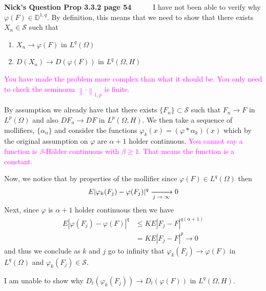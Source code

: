 \documentclass[a4paper,11pt]{article}
\numberwithin{equation}{section}
\theoremstyle{plain}
\theoremstyle{definition}
\newcommand{\Norm}[1]{\left\|  #1   \right\|}
\newcounter{NQ}
\newenvironment{NickQuestion}[1][] %
{\refstepcounter{NQ}
	\begin{mdframed}[backgroundcolor=lightgray]\textbf{Nick's Question \theNQ \: #1~~}~~~\noindent}%
	{\end{mdframed}}
\numberwithin{NQ}{section}
\numberwithin{LQ}{section}
\numberwithin{ZQ}{section}
\begin{document}
\begin{NickQuestion}[Prop 3.3.2 page 54]
	I have not been able to verify why $\varphi(F) \in \mathbb D^{1,q}$. By definition, this means that we need to show that there exists $X_n \in \mathcal S$ such that
	\begin{enumerate}
		\item $X_n \to \varphi(F)$ in $L^q(\Omega)$
		\item $D(X_n) \to D(\varphi(F))$ in $L^q(\Omega,H)$
	\end{enumerate}

	\textcolor{magenta}{You have made the problem more complex than what it should be. You only need to check the seminorm $\Norm{\cdot}_{1,p}$ is finite.}


	By assumption we already have that there exists $\{F_n\} \subset \mathcal S$ such that $F_n \to F$ in $L^p(\Omega)$ and also $DF_n \to DF$ in $L^p(\Omega,H)$. We then take a sequence of
	mollifiers, $\{\alpha_n\}$ and consider the functions $\varphi_k(x) = (\varphi * \alpha_k)(x)$ which by the original assumption on $\varphi$ are $\alpha+1$ holder continuous.
	\textcolor{magenta}{You cannot say a function is $\beta$-H\"older continuous with $\beta\ge 1$. That means the function is a constant.}

	Now, we notice that by properties of the mollifier since $\varphi(F) \in L^q(\Omega)$ then
		\begin{align*}
			E|\varphi_k(F_j)-\varphi(F_j)|^q \xrightarrow[\text{\text{$j \to \infty$}}]{\text{}} 0
		\end{align*}
	Next, since $\varphi$ is $\alpha +1$ holder continuous then we have
		\begin{align*}
				E|\varphi(F_j)-\varphi(F)|^q &\le KE|F_j-F|^{q(\alpha+1)}
				\\&=KE|F_j-F|^{p} \to 0
		\end{align*}
	and thus we conclude as $k$ and $j$ go to infinity that $\varphi_k(F_j) \to \varphi(F)$ in $L^q(\Omega)$ and $\varphi_k(F_j)\in \mathcal S$.

	I am unable to show why $D_t(\varphi_k(F_j)) \to D_t(\varphi(F))$ in $L^q(\Omega,H)$.


\end{NickQuestion}
\end{document}
